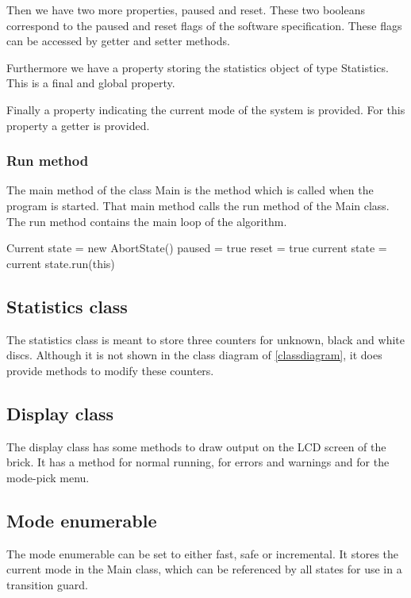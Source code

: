 \documentclass[a4paper,oneside,11pt]{article}
\begin{document}
Then we have two more properties, paused and reset. These two booleans correspond to the paused and reset flags of the software specification. These flags can be accessed by getter and setter methods.

Furthermore we have a property storing the statistics object of type Statistics. This is a final and global property.

Finally a property indicating the current mode of the system is provided. For this property a getter is provided.

\subsubsection{Run method}
The main method of the class Main is the method which is called when the program is started. That main method calls the run method of the Main class. The run method contains the main loop of the algorithm.

\newpage
\begin{algorithmic}[1]
\State Current state = new AbortState()
\State paused = true
\State reset = true
\EndIf
\State current state = current state.run(this)
\EndWhile
\end{algorithmic}

\subsection{Statistics class}
The statistics class is meant to store three counters for unknown, black and white discs. Although it is not shown in the class diagram of \ref{classdiagram}, it does provide methods to modify these counters.

\subsection{Display class}
The display class has some methods to draw output on the LCD screen of the brick. It has a method for normal running, for errors and warnings and for the mode-pick menu.

\subsection{Mode enumerable}
The mode enumerable can be set to either fast, safe or incremental. It stores the current mode in the Main class, which can be referenced by all states for use in a transition guard.
\end{document}
